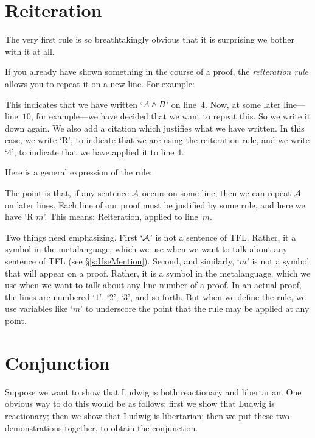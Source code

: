 \section{Reiteration}
The very first rule is so breathtakingly obvious that it is surprising we bother with it at all. 

If you already have shown something in the course of a proof, the \emph{reiteration rule} allows you to repeat it on a new line. For example:
\begin{fitchproof}
	\have[$\vdots$]{}{\vdots}
	 
\end{fitchproof}
This indicates that we have written `$A \wedge B$' on line~$4$. Now, at some later line---line~$10$, for example---we have decided that we want to repeat this. So we write it down again. We also add a citation which justifies what we have written. In this case, we write `R', to indicate that we are using the reiteration rule, and we write `$4$', to indicate that we have applied it to line $4$.

Here is a general expression of the rule:
\begin{fitchproof}
	 
\end{fitchproof}
The point is that, if any sentence $\mathcal{A}$ occurs on some line, then we can repeat $\mathcal{A}$ on later lines. Each line of our proof must be justified by some rule, and here we have `R $m$'. This means: Reiteration, applied to line~$m$. 

Two things need emphasizing. First `$\mathcal{A}$' is not a sentence of TFL. Rather, it a symbol in the metalanguage, which we use when we want to talk about any sentence of TFL (see \S\ref{s:UseMention}). Second, and similarly, `$m$' is not a symbol that will appear on a proof. Rather, it is a symbol in the metalanguage, which we use when we want to talk about any line number of a proof. In an actual proof, the lines are numbered `$1$', `$2$', `$3$', and so forth. But when we define the rule, we use variables like `$m$' to underscore the point that the rule may be applied at any point.

\section{Conjunction}
Suppose we want to show that Ludwig is both reactionary and libertarian. One obvious way to do this would be as follows: first we show that Ludwig is reactionary; then we show that Ludwig is libertarian; then we put these two demonstrations together, to obtain the conjunction.


